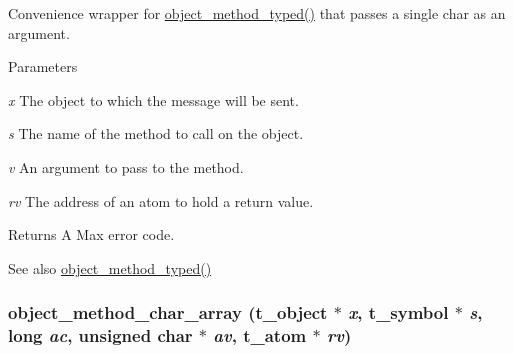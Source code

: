 Convenience wrapper for \hyperlink{group__obj_ga443dee482af22e0fe83e68955d367226}{object\_\-method\_\-typed()} that passes a single char as an argument. 
\begin{DoxyParams}{Parameters}
\item[{\em x}]The object to which the message will be sent. \item[{\em s}]The name of the method to call on the object. \item[{\em v}]An argument to pass to the method. \item[{\em rv}]The address of an atom to hold a return value.\end{DoxyParams}
\begin{DoxyReturn}{Returns}
A Max error code. 
\end{DoxyReturn}
\begin{DoxySeeAlso}{See also}
\hyperlink{group__obj_ga443dee482af22e0fe83e68955d367226}{object\_\-method\_\-typed()} 
\end{DoxySeeAlso}
\hypertarget{group__obj_ga8d2c36fbeff377ea30d4ac9d898a3d77}{
\subsubsection[{object\_\-method\_\-char\_\-array}]{ object\_\-method\_\-char\_\-array ({\bf t\_\-object} $\ast$ {\em x}, \/  {\bf t\_\-symbol} $\ast$ {\em s}, \/  long {\em ac}, \/  unsigned char $\ast$ {\em av}, \/  {\bf t\_\-atom} $\ast$ {\em rv})}}
\label{group__obj_ga8d2c36fbeff377ea30d4ac9d898a3d77}


